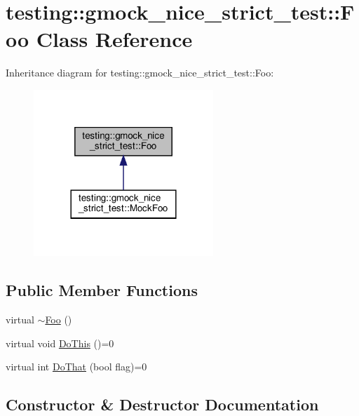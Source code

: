 \hypertarget{classtesting_1_1gmock__nice__strict__test_1_1_foo}{}\section{testing\+:\+:gmock\+\_\+nice\+\_\+strict\+\_\+test\+:\+:Foo Class Reference}
\label{classtesting_1_1gmock__nice__strict__test_1_1_foo}


Inheritance diagram for testing\+:\+:gmock\+\_\+nice\+\_\+strict\+\_\+test\+:\+:Foo\+:
\nopagebreak
\begin{figure}[H]
\begin{center}
\leavevmode
\includegraphics[width=192pt]{classtesting_1_1gmock__nice__strict__test_1_1_foo__inherit__graph}
\end{center}
\end{figure}
\subsection*{Public Member Functions}
\begin{DoxyCompactItemize}
\item 
virtual \hyperlink{classtesting_1_1gmock__nice__strict__test_1_1_foo_a7170ef9752ff35a749e63940461fb7ec}{$\sim$\+Foo} ()
\item 
virtual void \hyperlink{classtesting_1_1gmock__nice__strict__test_1_1_foo_a79a3cdbd8d9d9f6bc87580563b0d7cec}{Do\+This} ()=0
\item 
virtual int \hyperlink{classtesting_1_1gmock__nice__strict__test_1_1_foo_a8527a459b03f333a809a3376311a9f8b}{Do\+That} (bool flag)=0
\end{DoxyCompactItemize}


\subsection{Constructor \& Destructor Documentation}
\mbox{\label{classtesting_1_1gmock__nice__strict__test_1_1_foo_a7170ef9752ff35a749e63940461fb7ec}} 

